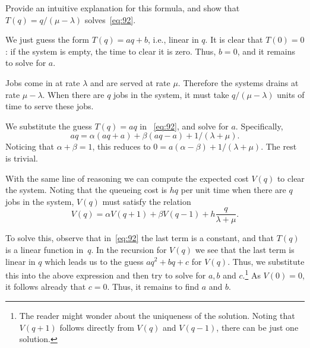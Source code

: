 \begin{exercise}\label{ex:aab}
Provide an intuitive explanation for this formula, and show that $T(q)=q/(\mu-\lambda)$ solves~\cref{eq:92}. 
\begin{hint}
We just guess the form $T(q) = aq + b$, i.e., linear in $q$. It is clear that $T(0)=0$: if the system is empty, the time to clear it is zero. Thus, $b=0$, and it remains to solve for $a$. 
\end{hint}

\begin{solution}
  Jobs come in at rate $\lambda$ and are served at rate $\mu$.
  Therefore the systems drains at rate $\mu-\lambda$.
  When there are $q$ jobs in the system, it must take $q/(\mu-\lambda)$ units of time to serve these jobs.

  We substitute the guess $T(q) = aq$ in ~\cref{eq:92}, and solve for $a$. Specifically,
  \begin{equation*}
    a q = \alpha (aq + a) + \beta (a q - a) + 1/(\lambda+\mu). 
  \end{equation*}
Noticing that $\alpha + \beta = 1$, this reduces to $0 = a(\alpha - \beta) + 1/(\lambda + \mu)$. The rest is trivial.
\end{solution}
\end{exercise}


With the same line of reasoning we can compute the expected cost $V(q)$ to clear the system.
Noting that the queueing cost is $hq$ per unit time when there are $q$ jobs in the system, $V(q)$ must satisfy the relation
\begin{equation}\label{eq:93}
  V(q) = \alpha V(q+1) + \beta V(q-1) + h\frac{q}{\lambda + \mu}.
\end{equation}


To solve this, observe that in~\cref{eq:92} the last term is a constant, and that $T(q)$ is a linear function in~$q$.
In the recursion for $V(q)$ we see that the last term is linear in $q$ which leads us to the guess $a q^2 + b q + c$ for $V(q)$.
Thus, we substitute this into the above expression and then try to solve for $a,b$ and $c$.\footnote{The reader might wonder about the uniqueness of the solution.
  Noting that $V(q+1)$ follows directly from $V(q)$ and $V(q-1)$, there can be just one solution.}
As $V(0)=0$, it follows already that $c=0$.
Thus, it remains to find $a$ and $b$.

